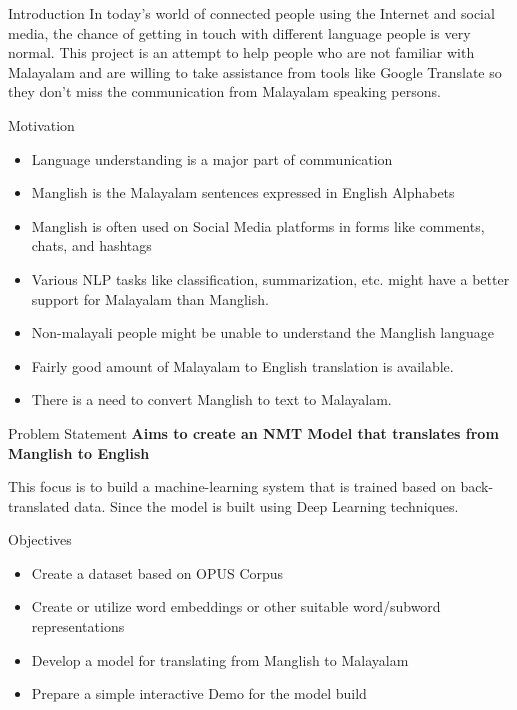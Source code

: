 \begin{chapter}{Introduction}
    \thispagestyle{empty}
    In today's world of connected people using the Internet and social media, the chance of getting in touch with different language people is very normal. This project is an attempt to help people who are not familiar with Malayalam and are willing to take assistance from tools like Google Translate so they don't miss the communication from Malayalam speaking persons.
    
    \begin{section}{Motivation}
        \begin{itemize}
  \item Language understanding is a major part of communication
  \item Manglish is the Malayalam sentences expressed in English
Alphabets
  \item Manglish is often used on Social Media platforms in forms like
comments, chats, and hashtags
  \item Various NLP tasks like classification, summarization, etc. might have a
better support for Malayalam than Manglish.
  \item Non-malayali people might be unable to understand the Manglish
language
  \item Fairly good amount of Malayalam to English translation is available.
  \item There is a need to convert Manglish to text to Malayalam.
\end{itemize}
    \end{section}

    \begin{section}{Problem Statement}
        \textbf{Aims to create an NMT Model that translates from
Manglish to English}

        \par This focus is to build a machine-learning system that is trained based on back-translated data. Since the model is built using Deep Learning techniques. 
        \begin{subsection}{Objectives}
            \begin{itemize}
  \item Create a dataset based on OPUS Corpus
  \item Create or utilize word embeddings or other suitable word/subword representations
  \item Develop a model for translating from Manglish to Malayalam
  \item Prepare a simple interactive Demo for the model build
\end{itemize}


\end{subsection}
\end{section}
\end{chapter}
